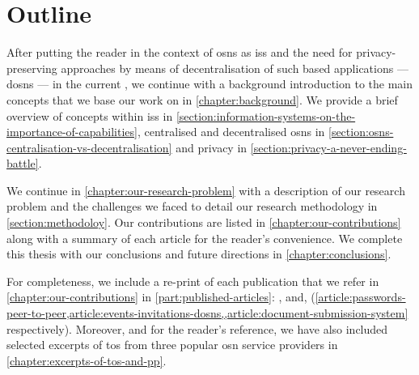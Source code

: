 \documentclass[showtrims,oldfontcommands]{kthesis}
\begin{document}
\section{Outline}
    \label{section:outline}
After putting the reader in the context of \acp{osn} as \acp{is} and the need for 
privacy-preserving approaches by means of decentralisation of such \Internet based 
applications --- \acp{dosn} --- in the current , 
we continue with a background introduction to the main concepts that we base our 
work on in \cref{chapter:background}. We provide a brief overview of concepts within 
\acp{is} in \cref{section:information-systems-on-the-importance-of-capabilities}, 
centralised and decentralised \acp{osn} in \cref{section:osns-centralisation-vs-decentralisation} 
and privacy in \cref{section:privacy-a-never-ending-battle}.

We continue in \cref{chapter:our-research-problem} with a description of our research 
problem and the challenges we faced to detail our research methodology 
in \cref{section:methodoloy}. Our contributions are listed in \cref{chapter:our-contributions} 
along with a summary of each article for the reader's convenience. We complete this 
thesis with our conclusions and future directions in \cref{chapter:conclusions}.

For completeness, we include a re-print of each publication that we refer in \cref{chapter:our-contributions} 
in \cref{part:published-articles}: ,  
and,  (\cref{article:passwords-peer-to-peer,article:events-invitations-dosns,,article:document-submission-system} 
respectively). Moreover, and for the reader's reference, we have also included selected 
excerpts of \ac{tos} from three popular \ac{osn} service providers in \cref{chapter:excerpts-of-tos-and-pp}.
\end{document}
